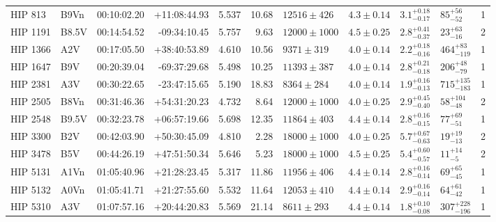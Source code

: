 \begin{landscape}
\begin{scriptsize}
\begin{longtable}{|l|lrrrrlllll|}
     HIP 813 &     B9Vn &    00:10:02.20 &   +11:08:44.93 &   5.537 &     10.68 &   $12516 \pm 426$ &  $4.3 \pm 0.14$ &  $3.1^{+0.18}_{-0.17}$ &      $85^{+56}_{-52}$ &       1 \\
    HIP 1191 &    B8.5V &    00:14:54.52 &   -09:34:10.45 &   5.757 &      9.63 &  $12000 \pm 1000$ &  $4.5 \pm 0.25$ &  $2.8^{+0.41}_{-0.37}$ &      $23^{+63}_{-16}$ &       2 \\
    HIP 1366 &      A2V &    00:17:05.50 &   +38:40:53.89 &   4.610 &     10.56 &    $9371 \pm 319$ &  $4.0 \pm 0.14$ &  $2.2^{+0.18}_{-0.16}$ &    $464^{+83}_{-119}$ &       1 \\
    HIP 1647 &      B9V &    00:20:39.04 &   -69:37:29.68 &   5.498 &     10.25 &   $11393 \pm 387$ &  $4.0 \pm 0.14$ &  $2.8^{+0.21}_{-0.18}$ &     $206^{+48}_{-79}$ &       1 \\
    HIP 2381 &      A3V &    00:30:22.65 &   -23:47:15.65 &   5.190 &     18.83 &    $8364 \pm 284$ &  $4.0 \pm 0.14$ &  $1.9^{+0.16}_{-0.13}$ &   $715^{+135}_{-183}$ &       1 \\
    HIP 2505 &     B8Vn &    00:31:46.36 &   +54:31:20.23 &   4.732 &      8.64 &  $12000 \pm 1000$ &  $4.0 \pm 0.25$ &  $2.9^{+0.45}_{-0.40}$ &     $58^{+104}_{-48}$ &       2 \\
    HIP 2548 &    B9.5V &    00:32:23.78 &   +06:57:19.66 &   5.698 &     12.35 &   $11864 \pm 403$ &  $4.4 \pm 0.14$ &  $2.8^{+0.16}_{-0.15}$ &      $77^{+69}_{-51}$ &       1 \\
    HIP 3300 &      B2V &    00:42:03.90 &   +50:30:45.09 &   4.810 &      2.28 &  $18000 \pm 1000$ &  $4.0 \pm 0.25$ &  $5.7^{+0.67}_{-0.63}$ &      $19^{+19}_{-13}$ &       2 \\
    HIP 3478 &      B5V &    00:44:26.19 &   +47:51:50.34 &   5.646 &      5.23 &  $18000 \pm 1000$ &  $4.5 \pm 0.25$ &  $5.4^{+0.60}_{-0.57}$ &       $11^{+14}_{-5}$ &       2 \\
    HIP 5131 &     A1Vn &    01:05:40.96 &   +21:28:23.45 &   5.317 &     11.86 &   $11956 \pm 406$ &  $4.4 \pm 0.14$ &  $2.8^{+0.16}_{-0.14}$ &      $69^{+65}_{-45}$ &       1 \\
    HIP 5132 &     A0Vn &    01:05:41.71 &   +21:27:55.60 &   5.532 &     11.64 &   $12053 \pm 410$ &  $4.4 \pm 0.14$ &  $2.9^{+0.16}_{-0.14}$ &      $64^{+61}_{-42}$ &       1 \\
    HIP 5310 &      A3V &    01:07:57.16 &   +20:44:20.83 &   5.569 &     21.14 &    $8611 \pm 293$ &  $4.4 \pm 0.14$ &  $1.8^{+0.10}_{-0.08}$ &   $307^{+228}_{-196}$ &       1 \\

\end{longtable}
\end{scriptsize}
\end{landscape}
